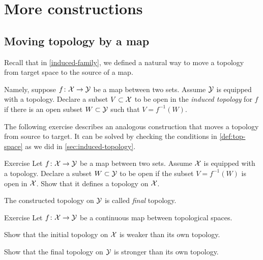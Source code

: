 \chapter{More constructions}

\section{Moving topology by a map}\label{sec:final-topology}

Recall that in \ref{induced-family}, we defined a natural way to move a topology from target space to the source of a map.

Namely, suppose $f\colon\mathcal{X}\to\mathcal{Y}$ be a map between two sets.
Assume $\mathcal{Y}$ is equipped with a topology.
Declare a subset $V\subset\mathcal{X}$ to be open in the \emph{induced topology} for $f$ if there is an open subset $W\subset\mathcal{Y}$ 
such that $V=f^{-1}(W)$.

The following exercise describes an analogous construction that moves a topology from source to target.
It can be solved by checking the conditions in \ref{def:top-space} as we did in \ref{sec:induced-topology}.

\begin{thm}{Exercise}\label{ex:move-topology:pushforward}
Let $f\colon\mathcal{X}\to\mathcal{Y}$ be a map between two sets.
Assume $\mathcal{X}$ is equipped with a topology.
Declare a subset $W\subset\mathcal{Y}$ to be open if the subset $V=f^{-1}(W)$ is open in $\mathcal{X}$.
Show that it defines a topology on $\mathcal{X}$.

\end{thm}

The constructed topology on $\mathcal{Y}$ is called \emph{final} topology.

\begin{thm}{Exercise}\label{ex:pullback/pushforward}
Let $f\colon\mathcal{X}\to\mathcal{Y}$ be a continuous map between topological spaces.

\begin{subthm}{}
Show that the initial topology on $\mathcal{X}$ is weaker than its own topology.
\end{subthm}

\begin{subthm}{}
Show that the final topology on $\mathcal{Y}$ is stronger than its own topology.
\end{subthm}

\end{thm}

